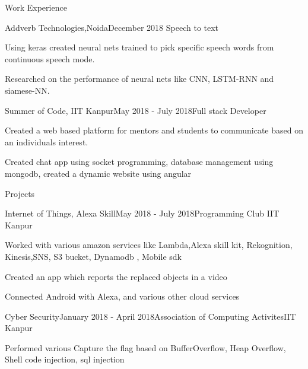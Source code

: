 \documentclass{resume}
\begin{document}
\begin{rSection}{Work Experience}

\begin{rSubsection}{Addverb Technologies,Noida}{December 2018}{ }{Speech to text}
\item Using keras created neural nets trained to pick specific speech words from continuous speech mode.
\item Researched on the performance of neural nets like CNN, LSTM-RNN and siamese-NN.
\end{rSubsection}


\begin{rSubsection}{Summer of Code, IIT Kanpur}{May 2018 - July 2018}{Full stack Developer}{}
\item Created a web based platform for mentors and students to communicate based on an individuals interest.
\item Created chat app using socket programming, database management using mongodb, created a dynamic website using angular
\end{rSubsection}


\end{rSection}
\begin{rSection}{Projects}

\begin{rSubsection}{Internet of Things, Alexa Skill}{May 2018 - July 2018}{Programming Club IIT Kanpur}{}
\item Worked with various amazon services like Lambda,Alexa skill kit, Rekognition, Kinesis,SNS, S3 bucket, Dynamodb , Mobile sdk
\item Created an app which reports the replaced objects in a video
\item Connected Android with Alexa, and various other cloud services
\end{rSubsection}


\begin{rSubsection}{Cyber Security}{January 2018 - April 2018}{Association of Computing Activites}{IIT Kanpur}
\item Performed various Capture the flag based on BufferOverflow, Heap Overflow, Shell code injection, sql injection
\end{rSubsection}

\end{rSection}

\clearpage
\end{document}
